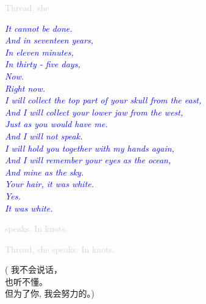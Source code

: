 \documentclass[11pt]{article}
\begin{document}
\begingroup
\begin{center}
\textcolor{lightgray}{Thread, she}
\rightskip\leftskip
\end{center}
\endgroup

\begingroup
\begin{center}
\textit{\textcolor{blue}{It cannot be done. \\ And in seventeen years, \\ In eleven minutes, \\ In thirty - five days, \\ Now. \\ Right now. \\ I will collect the top part of your skull from the east, \\ And I will collect your lower jaw from the west, \\ Just as you would have me. \\ And I will not speak. \\ I will hold you together with my hands again, \\ And I will remember your eyes as the ocean, \\ And mine as the sky. \\ Your hair, it was white. \\ Yes. \\ It was white.}}
\end{center}
\endgroup

\begingroup
\begin{center}
\textcolor{lightgray}{speaks. In knots.}
\rightskip\leftskip
\end{center}
\endgroup

\begingroup
\begin{center}
\textcolor{lightgray}{Thread, she speaks. In knots.}
\rightskip\leftskip
\end{center}
\endgroup

\vspace*{33\baselineskip}

\begingroup
\begin{center}
{\setmainfont{Source Han Serif SC}\selectfont
\textcolor{OliveGreen}{( 我不会说话，\\ \vspace*{2\baselineskip} 也听不懂。\\ \vspace*{2\baselineskip} 但为了你, 我会努力的。)}
}
\end{center}
\endgroup
\end{document}
